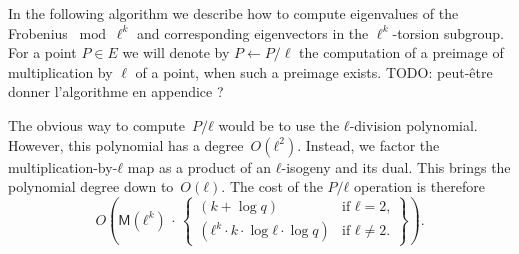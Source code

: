 \documentclass{lms}
\newcommand{\todo}[1]{{\color{red}TODO: #1}}
\def\pa#1{\left(#1\right)}
\def\cout#1{\mathsf{#1}}
\begin{document}
In the following algorithm we describe how to compute eigenvalues of
the Frobenius $\bmod \ell^k$ and
corresponding eigenvectors in the $\ell^{k}$-torsion subgroup.
For a point $P \in E$ we will denote by $P \leftarrow P/\ell$ the computation of a preimage of multiplication by $\ell$ of a point, when such a preimage exists.
\todo{peut-être donner l'algorithme en appendice ?}

The obvious way to compute~$P/ℓ$ would be to use the $ℓ$-division polynomial.
However, this polynomial has a degree~$O(ℓ^2)$.
Instead, we factor the multiplication-by-$ℓ$ map
as a product of an $ℓ$-isogeny and its dual.
This brings the polynomial degree down to~$O(ℓ)$.
The cost of the $P/ℓ$ operation is therefore
\begin{equation}\label{eq:div-by-l}
O \pa{\cout{M}(ℓ^k) \,· \,\left\lbrace\begin{array}{ll}
(k + \log q) & \text{if $ℓ = 2$,} \\
(ℓ^k · k · \log ℓ · \log q) & \text{if $ℓ ≠ 2$.}
\end{array}\right\rbrace}.
\end{equation}
\end{document}
